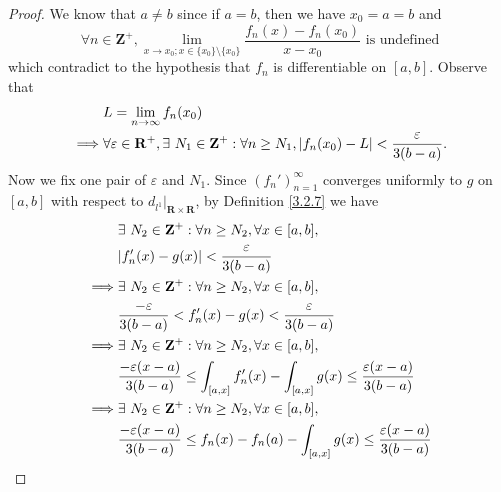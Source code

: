 \begin{proof}
    We know that \(a \neq b\) since if \(a = b\), then we have \(x_0 = a = b\) and
    \[
        \forall n \in \mathbf{Z}^+, \lim_{x \to x_0; x \in \{x_0\} \setminus \{x_0\}} \frac{f_n(x) - f_n(x_0)}{x - x_0} \text{ is undefined}
    \]
    which contradict to the hypothesis that \(f_n\) is differentiable on \([a, b]\).
    Observe that
    \begin{align*}
                 & L = \lim_{n \to \infty} f_n(x_0)                                                                                                              \\
        \implies & \forall \varepsilon \in \mathbf{R}^+, \exists\ N_1 \in \mathbf{Z}^+ : \forall n \geq N_1, \abs*{f_n(x_0) - L} < \frac{\varepsilon}{3(b - a)}.
    \end{align*}
    Now we fix one pair of \(\varepsilon\) and \(N_1\).
    Since \((f_n')_{n = 1}^\infty\) converges uniformly to \(g\) on \([a, b]\) with respect to \(d_{l^1}|_{\mathbf{R} \times \mathbf{R}}\), by Definition \ref{3.2.7} we have
    \begin{align*}
                 & \exists\ N_2 \in \mathbf{Z}^+ : \forall n \geq N_2, \forall x \in [a, b],                                                       \\
                 & \abs*{f_n'(x) - g(x)} < \frac{\varepsilon}{3(b - a)}                                                                            \\
        \implies & \exists\ N_2 \in \mathbf{Z}^+ : \forall n \geq N_2, \forall x \in [a, b],                                                       \\
                 & \frac{-\varepsilon}{3(b - a)} < f_n'(x) - g(x) < \frac{\varepsilon}{3(b - a)}                                                   \\
        \implies & \exists\ N_2 \in \mathbf{Z}^+ : \forall n \geq N_2, \forall x \in [a, b],                                                       \\
                 & \frac{-\varepsilon (x - a)}{3(b - a)} \leq \int_{[a, x]} f_n'(x) - \int_{[a, x]} g(x) \leq \frac{\varepsilon (x - a)}{3(b - a)} \\
        \implies & \exists\ N_2 \in \mathbf{Z}^+ : \forall n \geq N_2, \forall x \in [a, b],                                                       \\
                 & \frac{-\varepsilon (x - a)}{3(b - a)} \leq f_n(x) - f_n(a) - \int_{[a, x]} g(x) \leq \frac{\varepsilon (x - a)}{3(b - a)}       \\

\end{align*}
\end{proof}
